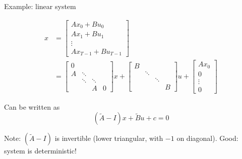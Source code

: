 \documentclass[xcolor=svgnames, english, smaller]{beamer}
\theoremstyle{plain}
\theoremstyle{definition}
\theoremstyle{plain}
\theoremstyle{plain}
\begin{document}
\begin{frame}{Example: linear system}

\begin{align*}
x &= 
\left[
\begin{array}{c}
A x_0 + B u_0 \\
A x_1 + B u_1 \\
\vdots \\
A x_{T-1} + B u_{T-1}
\end{array}
\right] \\
& =
\left[
\begin{array}{cccc} 
0 &             &            & \\
A & \ddots &           & \\
   & \ddots & \ddots& \\
   &            & A         & 0 
\end{array}
\right]
x + 
\left[\begin{array}{cccc}
B &             &            & \\
   & \ddots &             & \\
   &             & \ddots & \\
   &             &              &B
\end{array} \right]
u + 
\left[\begin{array}{c}
A x_0 \\
0 \\
\vdots \\
0
\end{array}\right]
\end{align*}

Can be written as 
\[
(\tilde{A} - I)x + \tilde{B} u + c = 0
\]

Note: $(\tilde{A} - I)$ is invertible (lower triangular, with $-1$ on diagonal). Good: system is deterministic!

\end{frame}



\end{document}
